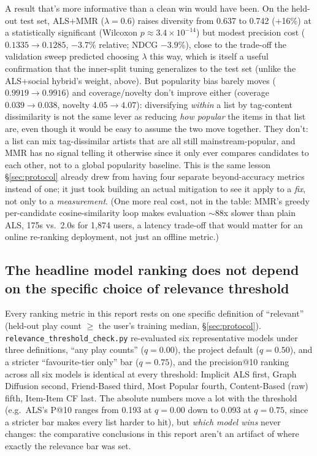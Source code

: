 \documentclass[11pt,a4paper]{article}
\newcommand{\code}[1]{\texttt{#1}}
\newcommand{\secref}[1]{\S\ref{#1}}
\begin{document}
A result that's more informative than a clean win would have been. On the held-out test set, ALS+MMR ($\lambda=0.6$) raises diversity from 0.637 to 0.742 (+16\%) at a statistically significant (Wilcoxon $p \approx 3.4 \times 10^{-14}$) but modest precision cost ($0.1335 \to 0.1285$, $-3.7\%$ relative; NDCG $-3.9\%$), close to the trade-off the validation sweep predicted choosing $\lambda$ this way, which is itself a useful confirmation that the inner-split tuning generalizes to the test set (unlike the ALS+social hybrid's weight, above). But popularity bias barely moves ($0.9919 \to 0.9916$) and coverage/novelty don't improve either (coverage $0.039 \to 0.038$, novelty $4.05 \to 4.07$): diversifying \emph{within} a list by tag-content dissimilarity is not the same lever as reducing \emph{how popular} the items in that list are, even though it would be easy to assume the two move together. They don't: a list can mix tag-dissimilar artists that are all still mainstream-popular, and MMR has no signal telling it otherwise since it only ever compares candidates to each other, not to a global popularity baseline. This is the same lesson \secref{sec:protocol} already drew from having four separate beyond-accuracy metrics instead of one; it just took building an actual mitigation to see it apply to a \emph{fix}, not only to a \emph{measurement}. (One more real cost, not in the table: MMR's greedy per-candidate cosine-similarity loop makes evaluation $\sim$88x slower than plain ALS, 175s vs.\ 2.0s for 1{,}874 users, a latency trade-off that would matter for an online re-ranking deployment, not just an offline metric.)

\subsection{The headline model ranking does not depend on the specific choice of relevance threshold}

Every ranking metric in this report rests on one specific definition of ``relevant'' (held-out play count $\geq$ the user's training median, \secref{sec:protocol}). \code{relevance\_threshold\_check.py} re-evaluated six representative models under three definitions, ``any play counts'' ($q=0.00$), the project default ($q=0.50$), and a stricter ``favourite-tier only'' bar ($q=0.75$), and the precision@10 ranking across all six models is identical at every threshold: Implicit ALS first, Graph Diffusion second, Friend-Based third, Most Popular fourth, Content-Based (raw) fifth, Item-Item CF last. The absolute numbers move a lot with the threshold (e.g.\ ALS's P@10 ranges from 0.193 at $q=0.00$ down to 0.093 at $q=0.75$, since a stricter bar makes every list harder to hit), but \emph{which model wins} never changes: the comparative conclusions in this report aren't an artifact of where exactly the relevance bar was set.
\end{document}

